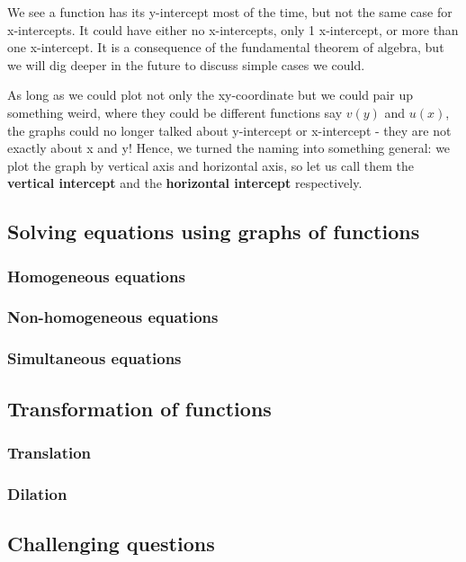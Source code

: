 \documentclass[12pt]{article}
\begin{document}
    We see a function has its y-intercept most of the time, but not the same case for x-intercepts. It could have either no x-intercepts, only 1 x-intercept, or more than one x-intercept. It is a consequence of the fundamental theorem of algebra, but we will dig deeper in the future to discuss simple cases we could.

    As long as we could plot not only the xy-coordinate but we could pair up something weird, where they could be different functions say $v(y)$ and $u(x)$, the graphs could no longer talked about y-intercept or x-intercept - they are not exactly about x and y! Hence, we turned the naming into something general: we plot the graph by vertical axis and horizontal axis, so let us call them the \textbf{vertical intercept} and the \textbf{horizontal intercept} respectively.

    \subsection{Solving equations using graphs of functions}

    \subsubsection{Homogeneous equations}

    \subsubsection{Non-homogeneous equations}

    \subsubsection{Simultaneous equations}

    \subsection{Transformation of functions}

    \subsubsection{Translation}

    \subsubsection{Dilation}

    \subsection{Challenging questions}
\end{document}
